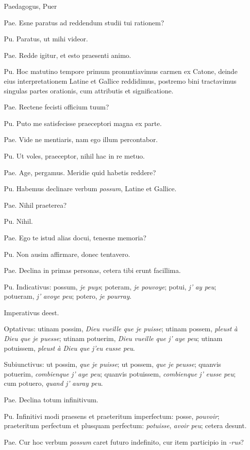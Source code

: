 \documentclass{article}
\newcommand{\fr}[1]{\foreignlanguage{french}{\emph{#1}}}
\begin{document}
Paedagogus, Puer

Pae. Esne paratus ad reddendum studii tui rationem?

Pu. Paratus, ut mihi videor.

Pae. Redde igitur, et esto praesenti animo.

Pu. Hoc matutino tempore primum pronuntiavimus carmen ex Catone, deinde eius interpretationem Latine et Gallice reddidimus, postremo bini tractavimus singulas partes orationis, cum attributis et significatione.

Pae. Rectene fecisti officium tuum?

Pu. Puto me satisfecisse praeceptori magna ex parte.

Pae. Vide ne mentiaris, nam ego illum percontabor.

Pu. Ut voles, praeceptor, nihil hac in re metuo.

Pae. Age, pergamus. Meridie quid habetis reddere?

Pu. Habemus declinare verbum \emph{possum}, Latine et Gallice.

Pae. Nihil praeterea?

Pu. Nihil.

Pae. Ego te istud alias docui, tenesne memoria?

Pu. Non ausim affirmare, donec tentavero.

Pae. Declina in primas personas, cetera tibi erunt facillima.

Pu. Indicativus: possum, \fr{je puys}; poteram, \fr{je pouvoye}; potui, \fr{j' ay peu}; potueram, \fr{j' avoye peu}; potero, \fr{je pourray}.

Imperativus deest.

Optativus: utinam possim, \fr{Dieu vueille que je puisse}; utinam possem, \fr{pleust à Dieu que je puesse}; utinam potuerim, \fr{Dieu vueille que j' aye peu}; utinam potuissem, \fr{pleust à Dieu que j'eu eusse peu}.

Subiunctivus: ut possim, \fr{que je puisse}; ut possem, \fr{que je peusse}; quanvis potuerim, \fr{combienque j' aye peu}; quanvis potuissem, \fr{combienque j’ eusse peu}; cum potuero, \fr{quand j' auray peu}.

Pae. Declina totum infinitivum.

Pu. Infinitivi modi praesens et praeteritum imperfectum: posse, \fr{pouvoir}; praeteritum perfectum et plusquam perfectum: \fr{potuisse}, \fr{avoir peu}; cetera desunt.

Pae. Cur hoc verbum \emph{possum} caret futuro indefinito, cur item participio in \emph{-rus}?
\end{document}
